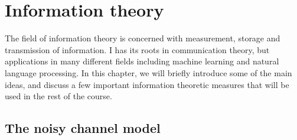 \chapter{\label{chap:information-theory}Information theory}

The field of information theory is concerned with measurement, storage
and transmission of information.
I has its roots in communication theory,
but applications in many different fields including machine learning
and natural language processing.
In this chapter,
we will briefly introduce some of the main ideas,
and discuss a few important information theoretic measures
that will be used in the rest of the course.

\section{The noisy channel model}

